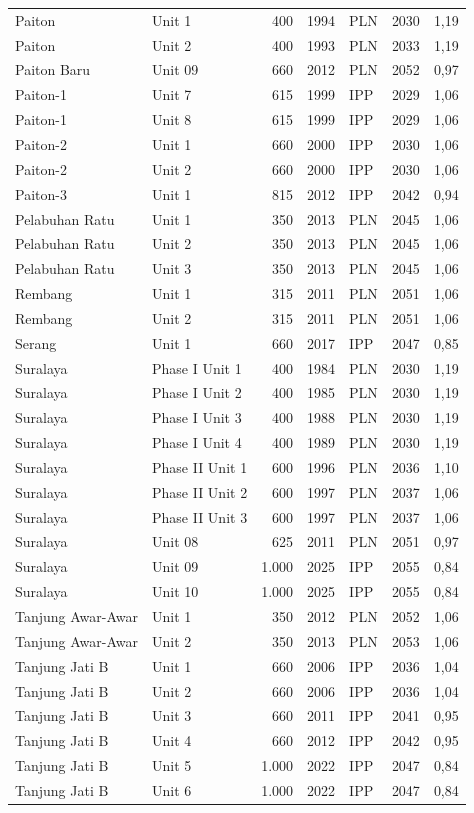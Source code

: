 \begin{longtable}{p{} p{} r r l r r}
Paiton & Unit 1 & 400 & 1994 & PLN & 2030 & 1,19 \\
Paiton & Unit 2 & 400 & 1993 & PLN & 2033 & 1,19 \\
Paiton Baru & Unit 09 & 660 & 2012 & PLN & 2052 & 0,97 \\
Paiton-1 & Unit 7 & 615 & 1999 & IPP & 2029 & 1,06 \\
Paiton-1 & Unit 8 & 615 & 1999 & IPP & 2029 & 1,06 \\
Paiton-2 & Unit 1 & 660 & 2000 & IPP & 2030 & 1,06 \\
Paiton-2 & Unit 2 & 660 & 2000 & IPP & 2030 & 1,06 \\
Paiton-3 & Unit 1 & 815 & 2012 & IPP & 2042 & 0,94 \\
Pelabuhan Ratu & Unit 1 & 350 & 2013 & PLN & 2045 & 1,06 \\
Pelabuhan Ratu & Unit 2 & 350 & 2013 & PLN & 2045 & 1,06 \\
Pelabuhan Ratu & Unit 3 & 350 & 2013 & PLN & 2045 & 1,06 \\
Rembang & Unit 1 & 315 & 2011 & PLN & 2051 & 1,06 \\
Rembang & Unit 2 & 315 & 2011 & PLN & 2051 & 1,06 \\
Serang & Unit 1 & 660 & 2017 & IPP & 2047 & 0,85 \\
Suralaya & Phase I Unit 1 & 400 & 1984 & PLN & 2030 & 1,19 \\
Suralaya & Phase I Unit 2 & 400 & 1985 & PLN & 2030 & 1,19 \\
Suralaya & Phase I Unit 3 & 400 & 1988 & PLN & 2030 & 1,19 \\
Suralaya & Phase I Unit 4 & 400 & 1989 & PLN & 2030 & 1,19 \\
Suralaya & Phase II Unit 1 & 600 & 1996 & PLN & 2036 & 1,10 \\
Suralaya & Phase II Unit 2 & 600 & 1997 & PLN & 2037 & 1,06 \\
Suralaya & Phase II Unit 3 & 600 & 1997 & PLN & 2037 & 1,06 \\
Suralaya & Unit 08 & 625 & 2011 & PLN & 2051 & 0,97 \\
Suralaya & Unit 09 & 1.000 & 2025 & IPP & 2055 & 0,84 \\
Suralaya & Unit 10 & 1.000 & 2025 & IPP & 2055 & 0,84 \\
Tanjung Awar-Awar & Unit 1 & 350 & 2012 & PLN & 2052 & 1,06 \\
Tanjung Awar-Awar & Unit 2 & 350 & 2013 & PLN & 2053 & 1,06 \\
Tanjung Jati B & Unit 1 & 660 & 2006 & IPP & 2036 & 1,04 \\
Tanjung Jati B & Unit 2 & 660 & 2006 & IPP & 2036 & 1,04 \\
Tanjung Jati B & Unit 3 & 660 & 2011 & IPP & 2041 & 0,95 \\
Tanjung Jati B & Unit 4 & 660 & 2012 & IPP & 2042 & 0,95 \\
Tanjung Jati B & Unit 5 & 1.000 & 2022 & IPP & 2047 & 0,84 \\
Tanjung Jati B & Unit 6 & 1.000 & 2022 & IPP & 2047 & 0,84 \\
\bottomrule
\end{longtable}

